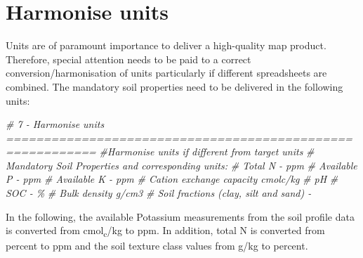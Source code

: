 \documentclass[
  10pt,
  b5paper,
  oneside]{book}
\newenvironment{Shaded}{\begin{snugshade}}{\end{snugshade}}
\newcommand{\CommentTok}[1]{\textcolor[rgb]{0.56,0.35,0.01}{\textit{#1}}}
\begin{document}
\hypertarget{harmonise-units}{%
\section{Harmonise units}\label{harmonise-units}}

Units are of paramount importance to deliver a high-quality map product. Therefore, special attention needs to be paid to a correct conversion/harmonisation of units particularly if different spreadsheets are combined. The mandatory soil properties need to be delivered in the following units:

\begin{Shaded}
\begin{Highlighting}[]
\CommentTok{\# 7 {-} Harmonise units ==========================================================}
\CommentTok{\#Harmonise units if different from target units}
\CommentTok{\# Mandatory Soil Properties and corresponding units:}
\CommentTok{\# Total N {-} ppm}
\CommentTok{\# Available P {-} ppm}
\CommentTok{\# Available K {-} ppm}
\CommentTok{\# Cation exchange capacity cmolc/kg}
\CommentTok{\# pH}
\CommentTok{\# SOC {-} \%}
\CommentTok{\# Bulk density g/cm3}
\CommentTok{\# Soil fractions (clay, silt and sand) {-} }
\end{Highlighting}
\end{Shaded}

In the following, the available Potassium measurements from the soil profile data is converted from cmol\textsubscript{c}/kg to ppm. In addition, total N is converted from percent to ppm and the soil texture class values from g/kg to percent.
\end{document}
